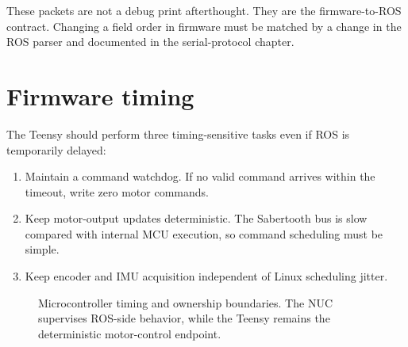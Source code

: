 These packets are not a debug print afterthought.  They are the firmware-to-ROS contract.  Changing a field order in firmware must be matched by a change in the ROS parser and documented in the serial-protocol chapter.

\section{Firmware timing}
The Teensy should perform three timing-sensitive tasks even if ROS is temporarily delayed:

\begin{enumerate}
  \item Maintain a command watchdog.  If no valid command arrives within the timeout, write zero motor commands.
  \item Keep motor-output updates deterministic.  The Sabertooth bus is slow compared with internal MCU execution, so command scheduling must be simple.
  \item Keep encoder and IMU acquisition independent of Linux scheduling jitter.
\end{enumerate}

\begin{figure}[htbp]
\centering
{}
\caption{Microcontroller timing and ownership boundaries. The NUC supervises ROS-side behavior, while the Teensy remains the deterministic motor-control endpoint.}
\end{figure}

